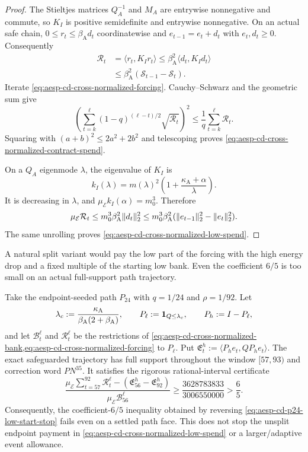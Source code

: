 \begin{proof}
The Stieltjes matrices $Q_A^{-1}$ and $M_A$ are entrywise nonnegative and
commute, so $K_I$ is positive semidefinite and entrywise nonnegative.  On an
actual safe chain, $0\leq r_t\leq\beta_{\mathrm A}d_t$ coordinatewise and
$e_{t-1}=e_t+d_t$ with $e_t,d_t\geq0$.  Consequently
\begin{align*}
 \mathcal R_t
 &=\langle r_t,K_Ir_t\rangle
 \leq\beta_{\mathrm A}^2\langle d_t,K_Id_t\rangle\\
 &\leq\beta_{\mathrm A}^2(\mathcal S_{t-1}-\mathcal S_t).
\end{align*}
Iterate \eqref{eq:aesp-cd-cross-normalized-forcing}.  Cauchy--Schwarz and
the geometric sum give
\[
 \left(\sum_{t=k}^{\ell}(1-q)^{(\ell-t)/2}\sqrt{\mathcal R_t}\right)^2
 \leq\frac1q\sum_{t=k}^{\ell}\mathcal R_t.
\]
Squaring with $(a+b)^2\leq2a^2+2b^2$ and telescoping proves
\eqref{eq:aesp-cd-cross-normalized-contract-spend}.

On a $Q_A$ eigenmode $\lambda$, the eigenvalue of $K_I$ is
\[
 k_I(\lambda)=m(\lambda)^2
 \left(1+\frac{\kappa_{\mathrm A}+\alpha}{\lambda}\right).
\]
It is decreasing in $\lambda$, and
$\mu_{\mathcal E}k_I(\alpha)=m_0^3$.  Therefore
\[
 \mu_{\mathcal E}\mathcal R_t
 \leq m_0^3\beta_{\mathrm A}^2\lVert d_t\rVert_2^2
 \leq m_0^3\beta_{\mathrm A}^2
 (\lVert e_{t-1}\rVert_2^2-\lVert e_t\rVert_2^2).
\]
The same unrolling proves \eqref{eq:aesp-cd-cross-normalized-low-spend}.
\end{proof}

A natural split variant would pay the low part of the forcing with the high
energy drop and a fixed multiple of the starting low bank.  Even the
coefficient $6/5$ is too small on an actual full-support path trajectory.

\begin{proposition}
\label{prop:aesp-cd-p24-low-start-stop}
Take the endpoint-seeded path $P_{24}$ with $q=1/24$ and $\rho=1/92$.  Let
\begin{equation*}
 \lambda_c:=\frac{\kappa_{\mathrm A}}
 {\beta_{\mathrm A}(2+\beta_{\mathrm A})},
 \qquad
 P_\ell:=\mathbf{1}_{Q\leq\lambda_c},
 \qquad P_h:=I-P_\ell,
\end{equation*}
and let $\mathcal B_t^\ell$ and $\mathcal R_t^\ell$ be the restrictions of
\cref{eq:aesp-cd-cross-normalized-bank,eq:aesp-cd-cross-normalized-forcing}
to $P_\ell$.  Put
$\mathfrak E_t^h:=\langle P_he_t,QP_he_t\rangle$.  The exact safeguarded
trajectory has full support throughout the window $[57,93)$ and correction
word $P N^{35}$.  It satisfies the rigorous rational-interval certificate
\begin{equation}
 \frac{
   \mu_{\mathcal E}\sum_{t=57}^{92}\mathcal R_t^\ell
   -(\mathfrak E_{56}^h-\mathfrak E_{92}^h)}
  {\mu_{\mathcal E}\mathcal B_{56}^\ell}
 \geq\frac{3628783833}{3006550000}
 >\frac65.
 \label{eq:aesp-cd-p24-low-start-stop}
\end{equation}
Consequently, the coefficient-$6/5$ inequality obtained by reversing
\cref{eq:aesp-cd-p24-low-start-stop} fails even on a settled path face.  This
does not stop the unsplit endpoint payment in
\cref{eq:aesp-cd-cross-normalized-low-spend} or a larger/adaptive event
allowance.
\end{proposition}

